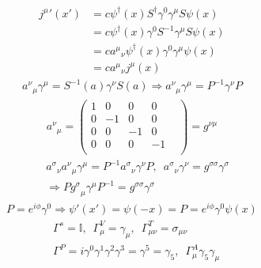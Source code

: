 \documentclass[floatfix,nofootinbib,superscriptaddress,fleqn]{revtex4}
\begin{document}
\begin{align*}
  {j^\mu}'(x')&=c\psi^\dagger(x)S^\dagger\gamma^0\gamma^\mu S\psi(x) \\
  &=c\psi^\dagger(x)\gamma^0S^{-1}\gamma^\mu S\psi(x)  \\
  &=c{a^\mu}_\nu\psi^\dagger(x)\gamma^0\gamma^\mu\psi(x)  \\
  &=c{a^\mu}_\nu j^\mu(x)
\end{align*}
\begin{align*}
  {a^\nu}_\mu\gamma^\mu = S^{-1}(a)\gamma^\nu S(a)\Longrightarrow
  {a^\nu}_\mu\gamma^\mu = P^{-1}\gamma^\nu P
\end{align*}
\begin{align*}
  {a^\nu}_\mu = \begin{pmatrix}
    1&0&0&0&  \\
    0&-1&0&0&  \\
    0&0&-1&0&  \\
    0&0&0&-1&  \\
  \end{pmatrix}
  =g^{\nu\mu}
\end{align*}
\begin{align*}
  &{a^\sigma}_\nu {a^\nu}_\mu\gamma^\mu=P^{-1}{a^\sigma}_\nu\gamma^\nu P,\,\,\,
  {a^\sigma}_\nu\gamma^\nu=g^{\sigma\sigma}\gamma^{\sigma}  \\\
  &\Longrightarrow P{g^\sigma}_\mu\gamma^\mu P^{-1}=g^{\sigma\sigma}\gamma^{\sigma} 
\end{align*}
\begin{align*}
  P=e^{i\phi}\gamma^0\Longrightarrow \psi'(x')=\psi(-x)=P=e^{i\phi}\gamma^0\psi(x)
\end{align*}
\begin{align*}
  &\Gamma^s=\mathbb{I},\,\,\,\Gamma^V_\mu=\gamma_\mu,\,\,\,\Gamma^T_{\mu\nu}=\sigma_{\mu\nu} \\
  &\Gamma^P=i\gamma^0\gamma^1\gamma^2\gamma^3=\gamma^5=\gamma_5,\,\,\,\Gamma^A_\mu\gamma_5\gamma_\mu
\end{align*}
\end{document}
